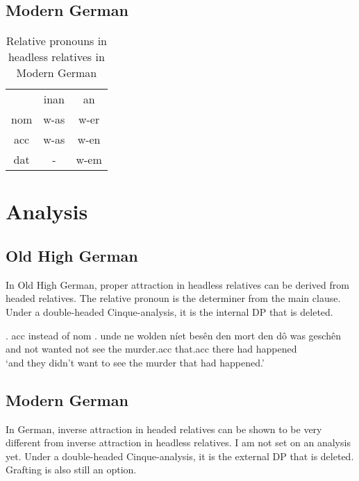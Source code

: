 \subsection{Modern German}

\begin{table}[h]
	\center
	\caption {Relative pronouns in headless relatives in Modern German}
		\begin{tabular}{ccc}
		\toprule
							& \ac{inan}	& \ac{an}	\\
								\cmidrule{2-3}
    \ac{nom} & w-as    		& w-er   		\\
    \ac{acc} & w-as    		& w-en   		\\
    \ac{dat} & -  					& w-em    	\\
		\bottomrule
		\end{tabular}
\end{table}

\section{Analysis}

\subsection{Old High German}
In Old High German, proper attraction in headless relatives can be derived from headed relatives. The relative pronoun is the determiner from the main clause. Under a double-headed Cinque-analysis, it is the internal DP that is deleted.




\ex. \ac{acc} instead of \ac{nom}
\ag. unde ne wolden níet besên den mort den dô was geschên\\
 and not wanted not see the murder.\ac{acc} that.\ac{acc} there had happened\\
 `and they didn't want to see the murder that had happened.' 



    \subsection{Modern German}
In German, inverse attraction in headed relatives can be shown to be very different from inverse attraction in headless relatives. I am not set on an analysis yet. Under a double-headed Cinque-analysis, it is the external DP that is deleted. Grafting is also still an option.


